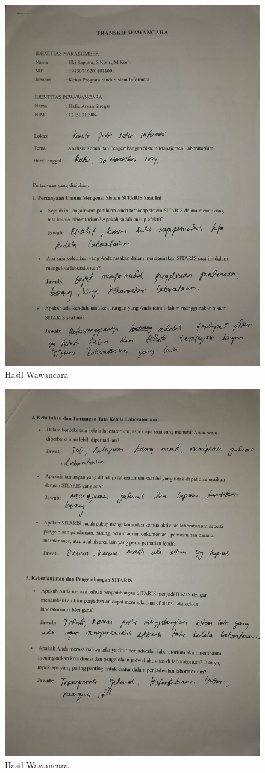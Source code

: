 \begin{figure}[h]
	\centering
	\includegraphics[width=0.82\linewidth]{konten/gambar/wawancara/1.jpg}
	\caption{Hasil Wawancara}
	\label{fig:hasil-wawancara}
\end{figure}
\begin{figure}[h]
	\centering
	\includegraphics[width=0.82\linewidth]{konten/gambar/wawancara/2.jpg}
	\caption{Hasil Wawancara}
	\label{fig:hasil-wawancara}
\end{figure}
